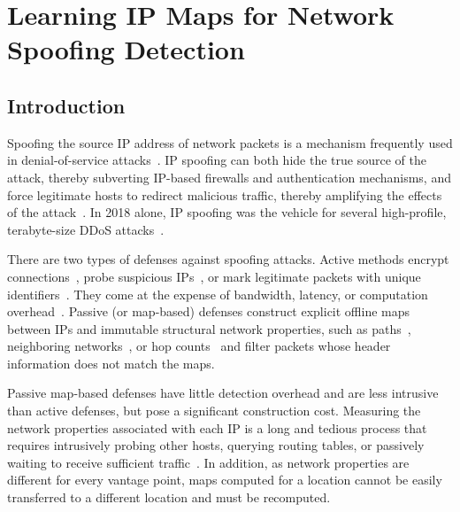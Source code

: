 


\section{Learning IP Maps for Network Spoofing Detection}
\subsection{Introduction}
\label{spoof:intro}

Spoofing the source IP address of network packets is a mechanism frequently used in denial-of-service attacks~\citep{spoofing-ddos,spoofing-ps}. IP spoofing can both hide the true source of the attack, thereby subverting IP-based firewalls and authentication mechanisms, and force legitimate hosts to redirect malicious traffic, thereby amplifying the effects of the attack~\citep{github-spoofing}. In 2018 alone, IP spoofing was the vehicle for several high-profile, terabyte-size DDoS attacks~\citep{cloudflare,github-spoofing}.  

There are two types of defenses against spoofing attacks. Active methods encrypt connections~\citep{ipsec}, probe suspicious IPs~\citep{puzzles}, or mark legitimate packets with unique identifiers~\citep{spm,spi}. They come at the expense of bandwidth, latency, or computation overhead~\citep{ipsec-overhead}.
%
Passive (or map-based) defenses construct explicit offline maps between IPs and immutable structural network properties, such as paths~\citep{rbf,idpf}, neighboring networks~\citep{ingress,egress,rpf}, or hop counts~\citep{iphc} and filter packets whose header information does not match the maps.


Passive map-based defenses have little detection overhead and are less intrusive than active defenses, but pose a significant construction cost.
%
Measuring the network properties associated with each IP is a long and tedious process that requires intrusively probing other hosts, querying routing tables, or passively waiting to receive sufficient traffic~\citep{hcf}.
%
In addition, as network properties are different for every vantage point, maps computed for a location cannot be easily transferred to a different location and must be recomputed.

